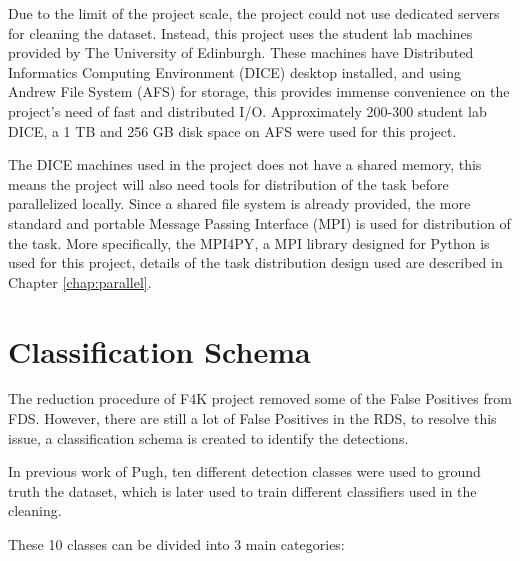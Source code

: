 \documentclass[bsc,logo,twoside,fullspacing,parskip]{infthesis}
\begin{document}
Due to the limit of the project scale, the project could not use dedicated servers for cleaning the dataset.
Instead, this project uses the student lab machines provided by The University of Edinburgh.
These machines have Distributed Informatics Computing Environment (DICE) desktop installed, and using Andrew File System (AFS) for storage, this provides immense convenience on the project's need of fast and distributed I/O.   
Approximately 200-300 student lab DICE, a 1 TB and 256 GB disk space on AFS were used for this project.

The DICE machines used in the project does not have a shared memory, this means the project will also need tools for distribution of the task before parallelized locally.
Since a shared file system is already provided, the more standard and portable Message Passing Interface (MPI) is used for distribution of the task. More specifically, the MPI4PY\cite{MPI4PY}, a MPI library designed for Python is used for this project, details of the task distribution design used are described in Chapter \ref{chap:parallel}.

\section{Classification Schema}
\label{sec:schema}

The reduction procedure of F4K project removed some of the False Positives from FDS. 
However, there are still a lot of False Positives in the RDS, to resolve this issue, a classification schema is created to identify the detections.

In previous work of Pugh\cite{P1}, ten different detection classes were used to ground truth the dataset, which is later used to train different classifiers used in the cleaning. 

These 10 classes can be divided into 3 main categories:

\renewcommand{\labelenumi}{\bfseries\Roman{enumi}}
\renewcommand{\labelenumii}{\bfseries\arabic{enumii}}
\renewcommand{\labelenumiii}{\bfseries\roman{enumiii}}
\end{document}

